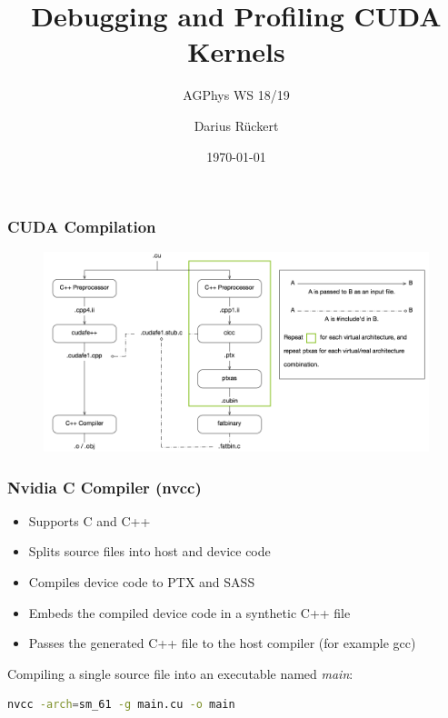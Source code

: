 \documentclass[aspectratio=169,handout]{beamer}
\subtitle{AGPhys WS 18/19}
\title{Debugging and Profiling CUDA Kernels}
\author[Darius Rückert]{Darius Rückert}
\date{\today}
\begin{document}
\frame
{
	\titlepage
}


\frame
{
	\frametitle{CUDA Compilation}
		\begin{figure}
	\centering
	\includegraphics[height=0.95\textheight]{nvcc}
\end{figure}
}


\begin{frame}[fragile]
	\frametitle{Nvidia C Compiler (nvcc)}
	\begin{itemize}
		\item Supports C and C++
		\item Splits source files into host and device code
		\item Compiles device code to PTX and SASS
		\item Embeds the compiled device code in a synthetic C++ file
		\item Passes the generated C++ file to the host compiler (for example gcc)
	\end{itemize}	
Compiling a single source file into an executable named \textit{main}:
\begin{lstlisting}[language=bash]
nvcc -arch=sm_61 -g main.cu -o main
\end{lstlisting}
\end{frame}
\end{document}
